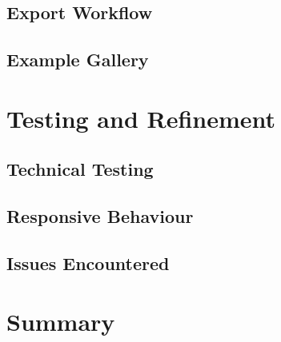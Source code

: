 \subsection{Export Workflow}
\subsection{Example Gallery}

\section{Testing and Refinement}
\subsection{Technical Testing}
\subsection{Responsive Behaviour}
\subsection{Issues Encountered}

\section{Summary}
